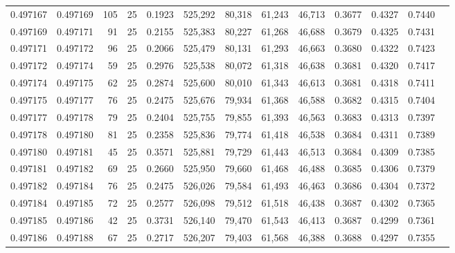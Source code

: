 \begin{tabular}{rrrrrrrrrrrrr}
0.497167 & 0.497169 &   105 &  25 &                                     0.1923 & 525,292 &  80,318 &  61,243 &  46,713 & 0.3677 & 0.4327 & 0.7440 \\
0.497169 & 0.497171 &    91 &  25 &                                     0.2155 & 525,383 &  80,227 &  61,268 &  46,688 & 0.3679 & 0.4325 & 0.7431 \\
0.497171 & 0.497172 &    96 &  25 &                                     0.2066 & 525,479 &  80,131 &  61,293 &  46,663 & 0.3680 & 0.4322 & 0.7423 \\
0.497172 & 0.497174 &    59 &  25 &                                     0.2976 & 525,538 &  80,072 &  61,318 &  46,638 & 0.3681 & 0.4320 & 0.7417 \\
0.497174 & 0.497175 &    62 &  25 &                                     0.2874 & 525,600 &  80,010 &  61,343 &  46,613 & 0.3681 & 0.4318 & 0.7411 \\
0.497175 & 0.497177 &    76 &  25 &                                     0.2475 & 525,676 &  79,934 &  61,368 &  46,588 & 0.3682 & 0.4315 & 0.7404 \\
0.497177 & 0.497178 &    79 &  25 &                                     0.2404 & 525,755 &  79,855 &  61,393 &  46,563 & 0.3683 & 0.4313 & 0.7397 \\
0.497178 & 0.497180 &    81 &  25 &                                     0.2358 & 525,836 &  79,774 &  61,418 &  46,538 & 0.3684 & 0.4311 & 0.7389 \\
0.497180 & 0.497181 &    45 &  25 &                                     0.3571 & 525,881 &  79,729 &  61,443 &  46,513 & 0.3684 & 0.4309 & 0.7385 \\
0.497181 & 0.497182 &    69 &  25 &                                     0.2660 & 525,950 &  79,660 &  61,468 &  46,488 & 0.3685 & 0.4306 & 0.7379 \\
0.497182 & 0.497184 &    76 &  25 &                                     0.2475 & 526,026 &  79,584 &  61,493 &  46,463 & 0.3686 & 0.4304 & 0.7372 \\
0.497184 & 0.497185 &    72 &  25 &                                     0.2577 & 526,098 &  79,512 &  61,518 &  46,438 & 0.3687 & 0.4302 & 0.7365 \\
0.497185 & 0.497186 &    42 &  25 &                                     0.3731 & 526,140 &  79,470 &  61,543 &  46,413 & 0.3687 & 0.4299 & 0.7361 \\
0.497186 & 0.497188 &    67 &  25 &                                     0.2717 & 526,207 &  79,403 &  61,568 &  46,388 & 0.3688 & 0.4297 & 0.7355 \\

\end{tabular}

